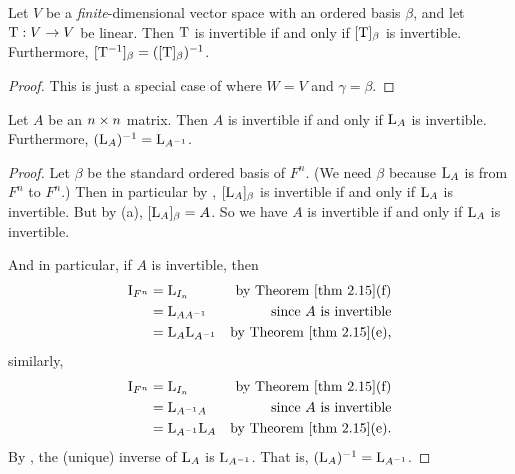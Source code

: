 \begin{corollary} \label{corollary 2.18.1}
Let \(V\) be a \emph{finite}-dimensional vector space with an ordered basis \(\beta\), and let \(\mathrm{T} : V \to V\) be linear.
Then \(\mathrm{T}\) is invertible if and only if \([\mathrm{T}]_\beta\)
is invertible.
Furthermore, \([\mathrm{T}^{-1}]_{\beta} = ([\mathrm{T}]_{\beta})^{-1}\).
\end{corollary}

\begin{proof}
This is just a special case of  where \(W = V\) and \(\gamma = \beta\).
\end{proof}

\begin{corollary} \label{corollary 2.18.2}
Let \(A\) be an \(n \times n\) matrix.
Then \(A\) is invertible if and only if \(\mathrm{L}_A\) is invertible. Furthermore, \((\mathrm{L}_A)^{-1} = \mathrm{L}_{A^{-1}}\).
\end{corollary}

\begin{proof}
Let \(\beta\) be the standard ordered basis of \(F^n\).
(We need \(\beta\) because \(\mathrm{L}_A\) is from \(F^n\) to \(F^n\).)
Then in particular by , \([\mathrm{L}_A]_{\beta}\) is invertible if and only if \(\mathrm{L}_A\) is invertible.
But by (a), \([\mathrm{L}_A]_{\beta} = A\).
So we have \(A\) is invertible if and only if \(\mathrm{L}_A\) is invertible.

And in particular, if \(A\) is invertible, then
\begin{align*}
    \mathrm{I}_{F^n} & = \LMTRAN_{I_n} & \text{by \THM{2.15}(f)} \\
                     & = \LMTRAN_{A A^{-1}} & \text{since \(A\) is invertible} \\
                     & = \LMTRAN_A \LMTRAN_{A^{-1}} & \text{by \THM{2.15}(e)},
\end{align*}
similarly,
\begin{align*}
    \mathrm{I}_{F^n} & = \LMTRAN_{I_n} & \text{by \THM{2.15}(f)} \\
                     & = \LMTRAN_{A^{-1} A} & \text{since \(A\) is invertible} \\
                     & = \LMTRAN_{A^{-1}} \LMTRAN_A & \text{by \THM{2.15}(e)}.
\end{align*}
By , the (unique) inverse of \(\mathrm{L}_A\) is \(\mathrm{L}_{A^{-1}}\).
That is, \((\mathrm{L}_A)^{-1} = \mathrm{L}_{A^{-1}}\).
\end{proof}

